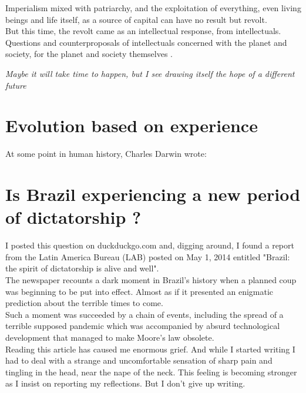 \documentclass[11pt]{book}
\begin{document}
\noindent Imperialism mixed with patriarchy, and the exploitation of everything, even living beings and life itself, as a source of capital can have no result but revolt. \\

\noindent But this time, the revolt came as an intellectual response, from intellectuals. \\

\noindent Questions and counterproposals of intellectuals concerned with the planet and society, for the planet and society themselves . \\

\noindent \begin{center} \emph{Maybe it will take time to happen, but I see drawing itself the hope of a different future} \end{center}

\chapter{Evolution based on experience}

At some point in human history, Charles Darwin wrote: 

\chapter{Is Brazil experiencing a new period of dictatorship ?}

\noindent I posted this question on duckduckgo.com and, digging around, I found a report from the Latin America Bureau (LAB) posted on May 1, 2014 entitled "Brazil: the spirit of dictatorship is alive and well". \\

\noindent The newspaper recounts a dark moment in Brazil's history when a planned coup was beginning to be put into effect. Almost as if it presented an enigmatic prediction about the terrible times to come. \\

\noindent Such a moment was succeeded by a chain of events, including the spread of a terrible supposed pandemic which was accompanied by absurd technological development that managed to make Moore's law obsolete. \\

\noindent Reading this article has caused me enormous grief. And while I started writing I had to deal with a strange and uncomfortable sensation of sharp pain and tingling in the head, near the nape of the neck. This feeling is becoming stronger as I insist on reporting my reflections. But I don't give up writing. \\
\end{document}
